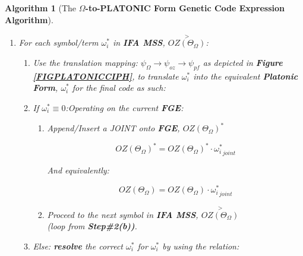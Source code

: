 \documentclass[a4paper, 18pt]{book} %
\newtheorem{alg}{Algorithm}
\begin{document}
\begin{alg}[The \textbf{$\Omega$-to-PLATONIC Form Genetic Code Expression Algorithm}]
\begin{enumerate}
{\begin{enumerate}
{\begin{equation}
\label{EQSTARTFGE}
\boxed{OZ(\Theta_\Omega)}^* = \langle \langle OZ(\Theta_\Omega) \rangle \langle \rangle \rangle
\end{equation}

This ensures, we have the prefix affix, \textbf{IFA}, as the contents of the sequence start of \textbf{FGE} \textit{extended} by a \textbf{still empty subsequence} --- in expression form, this shall merely be a backbone structure with \textbf{IFA} as its head, and a terminal that is ready to have more units appended to it, \textbf{after a single GAP/JOINT extension to IFA}. So, it also means, at this juncture:

\begin{equation}
\label{EQSTARTFGESUF}
\boxed{OZ(\Theta_\Omega)} = \langle \rangle
\end{equation}

}
\item{For each symbol/term $\omega_i^*$ in \textbf{IFA MSS}, $\overset{>}{OZ(\Theta_\Omega)}$: 
\begin{enumerate}
\item{ Use the translation mapping: $\psi_\Omega \rightarrow \psi_{oz} \rightarrow \psi_{pf}$ as depicted in \textbf{Figure \ref{FIGPLATONICCIPH}}, to translate $\omega_i^*$ into the equivalent \textbf{Platonic Form}, $\boxed{\omega_i^*}$ for the final code as such:}
\item { If $\omega_i^* \equiv 0$:Operating on the current \textbf{FGE}: 
		\begin{enumerate}
		\item { Append/Insert a JOINT onto \textbf{FGE},  $\boxed{OZ(\Theta_\Omega)}^*$

		\begin{equation}
		\label{EQEXTFGEJOINT}
		\boxed{OZ(\Theta_\Omega)}^* = \boxed{OZ(\Theta_\Omega)}^* \cdot \boxed{\omega_i^*}_{joint}
		\end{equation}		
		
		And equivalently:
		
		\begin{equation}
		\label{EQEXTFGEJOINTSUF}
		\boxed{OZ(\Theta_\Omega)} = \boxed{OZ(\Theta_\Omega)} \cdot \boxed{\omega_i^*}_{joint}
		\end{equation}				
		
		}
		\item Proceed to the next symbol in \textbf{IFA MSS}, $\overset{>}{OZ(\Theta_\Omega)}$\\ (loop from \textbf{Step\#2(b))}.
		\end{enumerate}
	}
	\item { Else: \textbf{resolve} the correct  $\boxed{\omega_i^*}$  for  $\omega_i^*$  by using the relation:\\

}
\end{enumerate}}
\end{enumerate}}
\end{enumerate}
\end{alg}
\end{document}
